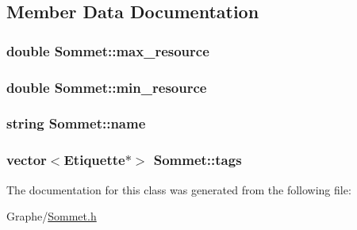 \subsection{Member Data Documentation}
\hypertarget{class_sommet_a3c96eeaddae5f06f293961daf8396130}{
\subsubsection[{max\+\_\+resource}]{\setlength{\rightskip}{0pt plus 5cm}double Sommet\+::max\+\_\+resource}}\label{class_sommet_a3c96eeaddae5f06f293961daf8396130}
\hypertarget{class_sommet_a002193136e0597afe2d559187ee597be}{
\subsubsection[{min\+\_\+resource}]{\setlength{\rightskip}{0pt plus 5cm}double Sommet\+::min\+\_\+resource}}\label{class_sommet_a002193136e0597afe2d559187ee597be}
\hypertarget{class_sommet_af32fce50ed4a5b4473722921986b34e5}{
\subsubsection[{name}]{\setlength{\rightskip}{0pt plus 5cm}string Sommet\+::name}}\label{class_sommet_af32fce50ed4a5b4473722921986b34e5}
\hypertarget{class_sommet_aeebbcd3b83e8cc9ef1d4aca4e23c7766}{
\subsubsection[{tags}]{\setlength{\rightskip}{0pt plus 5cm}vector$<${\bf Etiquette}$\ast$$>$ Sommet\+::tags}}\label{class_sommet_aeebbcd3b83e8cc9ef1d4aca4e23c7766}


The documentation for this class was generated from the following file\+:\begin{DoxyCompactItemize}
\item 
Graphe/\hyperlink{_sommet_8h}{Sommet.\+h}\end{DoxyCompactItemize}
